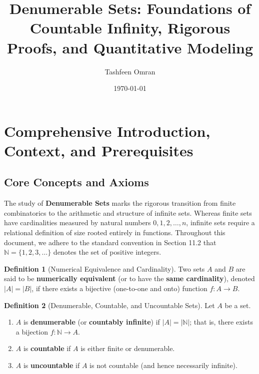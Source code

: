 \documentclass[11pt, letterpaper]{article}
\title{\textbf{Denumerable Sets: Foundations of Countable Infinity, Rigorous Proofs, and Quantitative Modeling}}
\author{Tashfeen Omran}
\date{\today}
\theoremstyle{definition}
\newtheorem{definition}{Definition}[section]
\theoremstyle{remark}
\begin{document}
\maketitle
\tableofcontents
\newpage

\section{Comprehensive Introduction, Context, and Prerequisites}

\subsection{Core Concepts and Axioms}

The study of \textbf{Denumerable Sets} marks the rigorous transition from finite combinatorics to the arithmetic and structure of infinite sets. Whereas finite sets have cardinalities measured by natural numbers $0, 1, 2, \dots, n$, infinite sets require a relational definition of size rooted entirely in functions. Throughout this document, we adhere to the standard convention in Section 11.2 that $\mathbb{N} = \{1, 2, 3, \dots\}$ denotes the set of positive integers.

\begin{definition}[Numerical Equivalence and Cardinality]
Two sets $A$ and $B$ are said to be \textbf{numerically equivalent} (or to have the \textbf{same cardinality}), denoted $|A| = |B|$, if there exists a bijective (one-to-one and onto) function $f : A \to B$.
\end{definition}

\begin{definition}[Denumerable, Countable, and Uncountable Sets]
Let $A$ be a set.
\begin{enumerate}[label=(\alph*)]
    \item $A$ is \textbf{denumerable} (or \textbf{countably infinite}) if $|A| = |\mathbb{N}|$; that is, there exists a bijection $f : \mathbb{N} \to A$.
    \item $A$ is \textbf{countable} if $A$ is either finite or denumerable.
    \item $A$ is \textbf{uncountable} if $A$ is not countable (and hence necessarily infinite).
\end{enumerate}
\end{definition}
\end{document}
